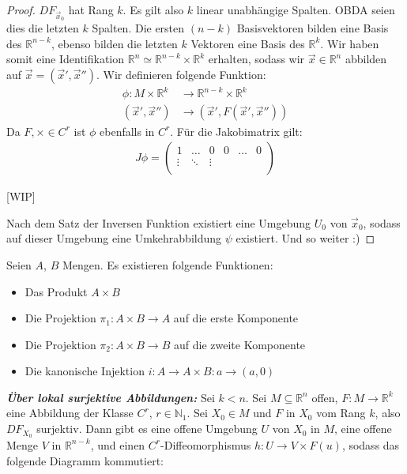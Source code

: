 \documentclass{report}
\newcommand{\tbf}[1]{\textbf{#1}}
\newcommand{\bN}{\mathbb{N}}
\newcommand{\bR}{\mathbb{R}}
\newcommand{\vx}{\vec{x}}
\begin{document}
\begin{proof}
 $DF_{\vx_0}$ hat Rang $k$. Es gilt also $k$ linear unabhängige Spalten. OBDA seien dies die letzten $k$ Spalten. Die ersten $(n-k)$ Basisvektoren bilden eine Basis des $\bR^{n-k}$, ebenso bilden die letzten $k$ Vektoren eine Basis des $\bR^k$. Wir haben somit eine Identifikation $\bR^n \simeq \bR^{n-k} \times \bR^k$ erhalten, sodass wir $\vx \in \bR^n$ abbilden auf $\vx = (\vx',\vx'')$. Wir definieren folgende Funktion:
 \begin{align*}
  \phi : M \times \bR^k &\to \bR^{n-k} \times \bR^k\\
  (\vx', \vx'') &\to (\vx', F(\vx', \vx''))
 \end{align*}
 Da $F, \times \in C^r$ ist $\phi$ ebenfalls in $C^r$. Für die Jakobimatrix gilt:
 \begin{align*}
  J \phi = 
  \begin{pmatrix}
    1 & \hdots & 0 & 0 & \hdots & 0\\
    \vdots & \ddots & \vdots\\
  \end{pmatrix}
 \end{align*}
 
 [WIP]
 
 Nach dem Satz der Inversen Funktion existiert eine Umgebung $U_0$ von $\vx_0$, sodass auf dieser Umgebung eine Umkehrabbildung $\psi$ existiert. Und so weiter :)
\end{proof}
\begin{anmerkung}
 Seien $A$, $B$ Mengen. Es existieren folgende Funktionen: 
 \begin{itemize}
  \item Das Produkt $A \times B$
  \item Die Projektion $\pi_1 : A \times B \to A$ auf die erste Komponente
  \item Die Projektion $\pi_2 : A \times B \to B$ auf die zweite Komponente
  \item Die kanonische Injektion $i : A \to A \times B : a \to (a,0)$
 \end{itemize}
\end{anmerkung}
\begin{theorem}
 \emph{\tbf{Über lokal surjektive Abbildungen:}} Sei $k < n$. Sei $M \subseteq \bR^n$ offen, $F : M \to \bR^k$ eine Abbildung der Klasse $C^r$, $r \in \bN_1$. Sei $X_0 \in M$ und $F$ in $X_0$ vom Rang $k$, also $DF_{X_0}$ surjektiv. Dann gibt es eine offene Umgebung $U$ von $X_0$ in $M$, eine offene Menge $V$ in $\bR^{n-k}$, und einen $C^r$-Diffeomorphismus $h : U \to V \times F(u)$, sodass das folgende Diagramm kommutiert:
 \begin{figure}[h!]
 \centering
\end{figure}
\end{theorem}
\end{document}
